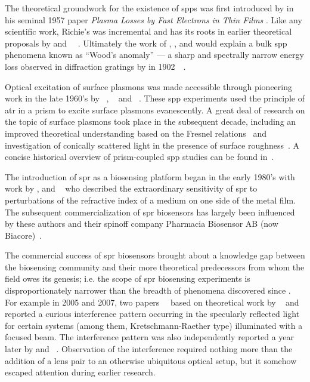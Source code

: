The theoretical groundwork for the existence of \glspl{spp} was first
introduced by  in his seminal 1957 paper \textit{Plasma Losses by
Fast Electrons in Thin Films} \cite{ritchie1957plasma}.  Like any scientific
work, Richie's was incremental and has its roots in earlier theoretical
proposals by  and
~\cite{bohm1951collective}~\cite{pines1952collective}.  Ultimately
the work of , , and  would explain a bulk
\gls{spp} phenomena known as ``Wood's anomaly'' --- a sharp and spectrally
narrow energy loss observed in diffraction gratings by  in
1902~\cite{wood1902remarkable}~\cite{rayleigh1907remarkable}.

Optical excitation of surface plasmons was made accessible through
pioneering work in the late 1960's by
~\cite{kretschmann1968},
~\cite{raether1988springer} and
~\cite{otto1968excitation}.  These \gls{spp} experiments used the
principle of \gls{atr} in a prism to excite surface
plasmons evanescently.  A great deal of research on the topic of surface
plasmons took place in the subsequent decade, including an improved
theoretical understanding based on the Fresnel
relations~\cite{chen1976excitation} and investigation of conically scattered
light in the presence of surface roughness~\cite{simon1976directional}.  A
concise historical overview of prism-coupled \gls{spp} studies can be found
in~\cite{raether1997surface}.

The introduction of \gls{spr} as a biosensing platform began in the early
1980's with work by ,  and
~\cite{liedberg1983surface} who described the extraordinary
sensitivity of \gls{spr} to perturbations of the refractive
index of a medium on one side of the metal film.  The subsequent
commercialization of \gls{spr} biosensors has largely been influenced by these
authors and their spinoff company Pharmacia Biosensor AB (now
Biacore)~\cite{liedberg1995biosensing}.

The commercial success of \gls{spr} biosensors brought about a knowledge gap between
the biosensing community and their more theoretical predecessors from whom the
field owes its genesis; i.e\@. the scope of \gls{spr} biosensing experiments is
disproportionately narrower than the breadth of phenomena discovered since
.  For example in 2005 and 2007, two
papers~\cite{andaloro2005optical}~\cite{simon2007observation} based on
theoretical work by ~\cite{chuang1986lateral} and 
\cite{chen1976excitation} reported a curious interference pattern occurring in
the specularly reflected light for certain systems (among them,
Kretschmann-Raether type) illuminated with a focused beam.  The interference
pattern was also independently reported a year later by  and
~\cite{schumann2008near}.  Observation of the interference
required nothing more than the addition of a lens pair to an otherwise
ubiquitous optical setup, but it somehow escaped attention during earlier
research.

